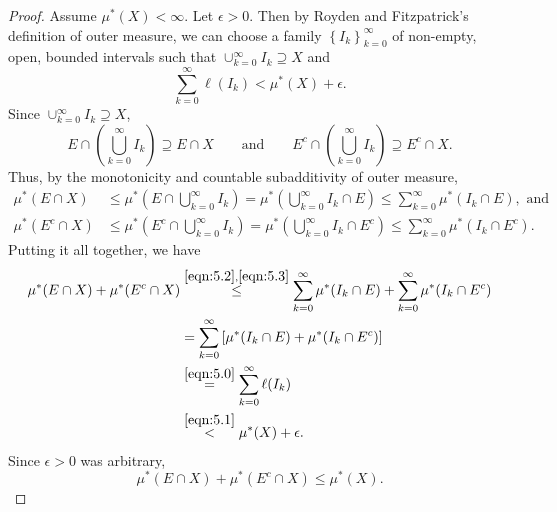 \documentclass[12pt]{article}
\begin{document}
\begin{proof}
Assume $\mu^{*}(X) < \infty$. Let $\epsilon > 0$. Then by Royden and Fitzpatrick's definition of outer measure, we can choose a family $\left\{ I_{k}
\right\}_{k=0}^{\infty}$ of non-empty, open, bounded intervals such that $\cup_{k=0}^{\infty}I_{k} \supseteq X$ and 
\begin{equation}
\sum_{k=0}^{\infty}\ell(I_{k}) < \mu^{*}(X) + \epsilon.
\label{eqn:5.1}
\end{equation}
Since $\cup_{k=0}^{\infty}I_{k} \supseteq X$,
\[ E\cap \left( \bigcup_{k=0}^{\infty}I_{k} \right) \supseteq E \cap X  \qquad \text{and}\qquad E^{c} \cap \left( \bigcup_{k=0}^{\infty}I_{k} \right)
\supseteq E^{c} \cap X. \]
Thus, by the monotonicity and countable subadditivity of outer measure, 
\begin{align}
\mu^{*}\left( E \cap X \right) & \leq \mu^{*}\left( E\cap \bigcup_{k=0}^{\infty}I_{k} \right) = \mu^{*}\left( \bigcup_{k=0}^{\infty}I_{k}\cap E
\right) \leq \sum_{k=0}^{\infty}\mu^{*}(I_{k}\cap E), \text{ and } \label{eqn:5.2} \\
\mu^{*}\left( E^{c} \cap X \right) & \leq \mu^{*}\left( E^{c}\cap \bigcup_{k=0}^{\infty}I_{k} \right) = \mu^{*}\left( \bigcup_{k=0}^{\infty}I_{k}\cap
E^{c} \right) \leq \sum_{k=0}^{\infty}\mu^{*}(I_{k}\cap E^{c}).
\label{eqn:5.3}
\end{align}
Putting it all together, we have 
\begin{align*}
\mu^{*}(E\cap X) + \mu^{*}(E^{c} \cap X) & \stackrel{\ref{eqn:5.2},\ref{eqn:5.3}}{\leq} \sum_{k=0}^{\infty}\mu^{*}(I_{k}\cap E) + \sum_{k=0}^{\infty}\mu^{*}(I_{k}\cap E^{c}) \\
& = \sum_{k=0}^{\infty}\left[ \mu^{*}(I_{k}\cap E) + \mu^{*}(I_{k}\cap E^{c}) \right] \\
& \stackrel{\ref{eqn:5.0}}{=} \sum_{k=0}^{\infty}\ell(I_{k}) \\
& \stackrel{\ref{eqn:5.1}}{<} \mu^{*}(X) + \epsilon.
\end{align*}
Since $\epsilon > 0$ was arbitrary,
\[ \mu^{*}(E\cap X) + \mu^{*}(E^{c} \cap X) \leq \mu^{*}(X). \]
\end{proof}
\end{document}
